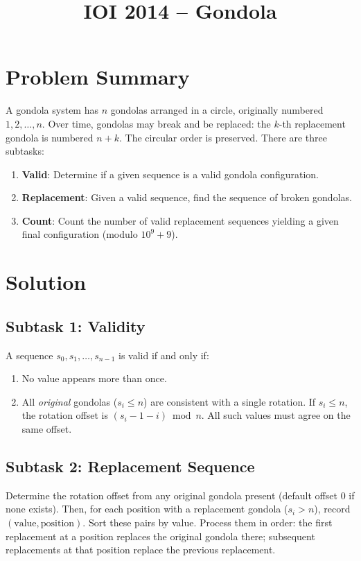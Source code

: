 \documentclass[11pt,a4paper]{article}
\title{IOI 2014 -- Gondola}
\author{}
\date{}
\begin{document}
\maketitle

\section{Problem Summary}

A gondola system has $n$ gondolas arranged in a circle, originally numbered $1, 2, \ldots, n$. Over time, gondolas may break and be replaced: the $k$-th replacement gondola is numbered $n + k$. The circular order is preserved. There are three subtasks:
\begin{enumerate}
  \item \textbf{Valid}: Determine if a given sequence is a valid gondola configuration.
  \item \textbf{Replacement}: Given a valid sequence, find the sequence of broken gondolas.
  \item \textbf{Count}: Count the number of valid replacement sequences yielding a given final configuration (modulo $10^9 + 9$).
\end{enumerate}

\section{Solution}

\subsection{Subtask 1: Validity}

A sequence $s_0, s_1, \ldots, s_{n-1}$ is valid if and only if:
\begin{enumerate}
  \item No value appears more than once.
  \item All \emph{original} gondolas ($s_i \le n$) are consistent with a single rotation. If $s_i \le n$, the rotation offset is $(s_i - 1 - i) \bmod n$. All such values must agree on the same offset.
\end{enumerate}

\subsection{Subtask 2: Replacement Sequence}

Determine the rotation offset from any original gondola present (default offset $0$ if none exists). Then, for each position with a replacement gondola ($s_i > n$), record $(\text{value}, \text{position})$. Sort these pairs by value. Process them in order: the first replacement at a position replaces the original gondola there; subsequent replacements at that position replace the previous replacement.
\end{document}
